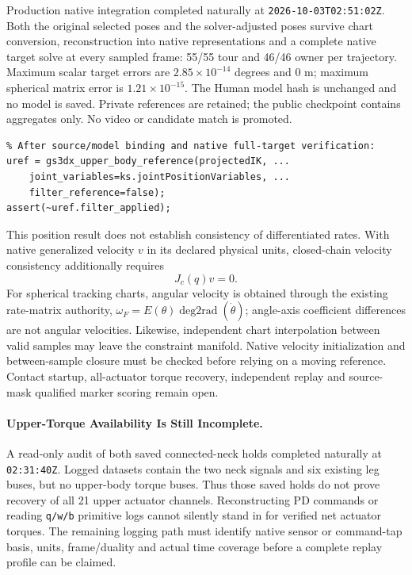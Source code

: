 \documentclass[11pt,a4paper]{article}
\begin{document}
Production native integration completed naturally at
\texttt{2026-10-03T02:51:02Z}. Both the original selected poses and the
solver-adjusted poses survive chart conversion, reconstruction into native
representations and a complete native target solve at every sampled frame:
55/55 tour and 46/46 owner per trajectory. Maximum scalar target errors are
$2.85\times10^{-14}$ degrees and $0$ m; maximum spherical matrix error is
$1.21\times10^{-15}$. The Human model hash is unchanged and no model is
saved. Private references are retained; the public checkpoint contains
aggregates only. No video or candidate match is promoted.

\begin{verbatim}
% After source/model binding and native full-target verification:
uref = gs3dx_upper_body_reference(projectedIK, ...
    joint_variables=ks.jointPositionVariables, ...
    filter_reference=false);
assert(~uref.filter_applied);
\end{verbatim}
This position result does not establish consistency of differentiated
rates. With native generalized velocity $v$ in its declared physical units,
closed-chain velocity consistency additionally requires
\[
 J_c(q)v=0.
\]
For spherical tracking charts, angular velocity is obtained through the
existing rate-matrix authority,
$\omega_F=E(\theta)\operatorname{deg2rad}(\dot\theta)$;
angle-axis coefficient differences are not angular velocities. Likewise,
independent chart interpolation between valid samples may leave the
constraint manifold. Native velocity initialization and between-sample
closure must be checked before relying on a moving reference. Contact
startup, all-actuator torque recovery, independent replay and source-mask
qualified marker scoring remain open.

\paragraph{Upper-Torque Availability Is Still Incomplete.}
A read-only audit of both saved connected-neck holds completed naturally
at \texttt{02:31:40Z}. Logged datasets contain the two neck signals and
six existing leg buses, but no upper-body torque buses. Thus those saved
holds do not prove recovery of all 21 upper actuator channels. Reconstructing
PD commands or reading \texttt{q/w/b} primitive logs cannot silently stand
in for verified net actuator torques. The remaining logging path must
identify native sensor or command-tap basis, units, frame/duality and actual
time coverage before a complete replay profile can be claimed.
\end{document}
